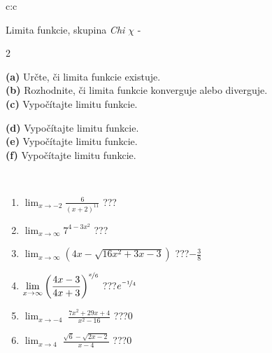 \documentclass[10pt]{report}
\begin{document}
\newpage
\thispagestyle{empty}
\begin{tabular}{c:c}
\begin{minipage}[c][104.5mm][t]{0.5\linewidth}
\begin{center}
\vspace{7mm}
{\huge Limita funkcie, skupina \textit{Chi $\chi$} -}\\[5mm]
\begin{minipage}{0.95\linewidth}
\begin{center}
{\small \begin{multicols}{2} \raggedright
\textbf{(a)} Určte, či limita funkcie existuje. \\[1mm]
\textbf{(b)} Rozhodnite, či limita funkcie konverguje alebo diverguje. \\[1mm]
\textbf{(c)} Vypočítajte limitu funkcie. \par \columnbreak
\textbf{(d)} Vypočítajte limitu funkcie. \\[1mm]
\textbf{(e)} Vypočítajte limitu funkcie. \\[1mm]
\textbf{(f)} Vypočítajte limitu funkcie. \\[1mm]
\end{multicols}
}
\end{center}
\end{minipage}
\\[4mm]
\begin{minipage}{0.79\linewidth}
\begin{center}
\begin{varwidth}{\linewidth}
\begin{enumerate}
\normalsize
\item $\displaystyle\lim_{x\to-2}{\frac{6}{(x+2)^{11}}}$\quad \dotfill\; ???\;\dotfill \quad {}
\item $\displaystyle\lim_{x\to\infty}{7^{4-3x^2}}$\quad \dotfill\; ???\;\dotfill \quad {}
\item $\displaystyle\lim_{x\to\infty}{\left(4x - \sqrt{16x^2+3x-3}\right)}$\quad \dotfill\; ???\;\dotfill \quad $-\frac{3}{8}$
\item $\displaystyle\lim_{x\to\infty}{\left( \frac{4x-3}{4x+3} \right)^{\nicefrac{x}{6}}}$\quad \dotfill\; ???\;\dotfill \quad $e^{\nicefrac{-1}{4}}$
\item $\displaystyle\lim_{x\to -4}{\;\frac{7x^2+29x+4}{x^2-16}}$\quad \dotfill\; ???\;\dotfill \quad $0$
\item $\displaystyle\lim_{x\to 4}{\;\frac{\sqrt{6}-\sqrt{2x-2}}{x-4}}$\quad \dotfill\; ???\;\dotfill \quad $0$

\end{enumerate}
\end{varwidth}
\end{center}
\end{minipage}
\end{center}
\end{minipage}
\end{tabular}
\end{document}
